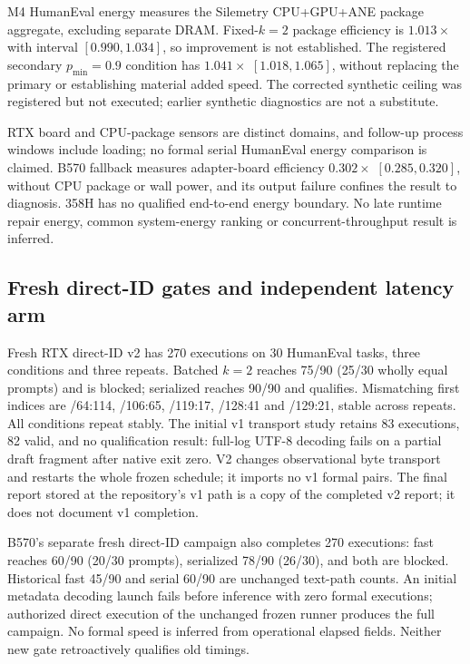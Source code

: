 M4 HumanEval energy measures the Silemetry CPU+GPU+ANE package aggregate, excluding separate DRAM. Fixed-$k=2$ package efficiency is $1.013\times$ with interval $[0.990,1.034]$, so improvement is not established. The registered secondary $p_{\min}=0.9$ condition has $1.041\times$ $[1.018,1.065]$, without replacing the primary or establishing material added speed. The corrected synthetic ceiling was registered but not executed; earlier synthetic diagnostics are not a substitute.

RTX board and CPU-package sensors are distinct domains, and follow-up process windows include loading; no formal serial HumanEval energy comparison is claimed. B570 fallback measures adapter-board efficiency $0.302\times$ $[0.285,0.320]$, without CPU package or wall power, and its output failure confines the result to diagnosis. 358H has no qualified end-to-end energy boundary. No late runtime repair energy, common system-energy ranking or concurrent-throughput result is inferred.

\subsection{Fresh direct-ID gates and independent latency arm}
\label{supp:historical_id_gates}
Fresh RTX direct-ID v2 has 270 executions on 30 HumanEval tasks, three conditions and three repeats. Batched $k=2$ reaches 75/90 (25/30 wholly equal prompts) and is blocked; serialized reaches 90/90 and qualifies. Mismatching first indices are /64:114, /106:65, /119:17, /128:41 and /129:21, stable across repeats. All conditions repeat stably. The initial v1 transport study retains 83 executions, 82 valid, and no qualification result: full-log UTF-8 decoding fails on a partial draft fragment after native exit zero. V2 changes observational byte transport and restarts the whole frozen schedule; it imports no v1 formal pairs. The final report stored at the repository's v1 path is a copy of the completed v2 report; it does not document v1 completion.

B570's separate fresh direct-ID campaign also completes 270 executions: fast reaches 60/90 (20/30 prompts), serialized 78/90 (26/30), and both are blocked. Historical fast 45/90 and serial 60/90 are unchanged text-path counts. An initial metadata decoding launch fails before inference with zero formal executions; authorized direct execution of the unchanged frozen runner produces the full campaign. No formal speed is inferred from operational elapsed fields. Neither new gate retroactively qualifies old timings.

